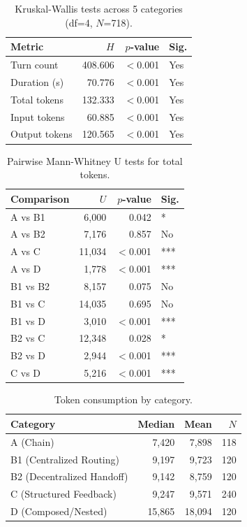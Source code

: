 \documentclass{article}
\begin{document}
\begin{table}[H]
\centering
\caption{Kruskal-Wallis tests across 5 categories (df=4, $N$=718).}
\label{tab:kruskal}
{\small
\begin{tabular}{@{}lrrl@{}}
\toprule
\textbf{Metric} & \textbf{$H$} & \textbf{$p$-value} & \textbf{Sig.} \\
\midrule
Turn count & 408.606 & $<$0.001 & Yes \\
Duration (s) & 70.776 & $<$0.001 & Yes \\
Total tokens & 132.333 & $<$0.001 & Yes \\
Input tokens & 60.885 & $<$0.001 & Yes \\
Output tokens & 120.565 & $<$0.001 & Yes \\
\bottomrule
\end{tabular}
}
\end{table}

\begin{table}[H]
\centering
\caption{Pairwise Mann-Whitney U tests for total tokens.}
\label{tab:pairwise}
{\small
\begin{tabular}{@{}lrrl@{}}
\toprule
\textbf{Comparison} & \textbf{$U$} & \textbf{$p$-value} & \textbf{Sig.} \\
\midrule
A vs B1 & 6,000 & 0.042 & * \\
A vs B2 & 7,176 & 0.857 & No \\
A vs C & 11,034 & $<$0.001 & *** \\
A vs D & 1,778 & $<$0.001 & *** \\
B1 vs B2 & 8,157 & 0.075 & No \\
B1 vs C & 14,035 & 0.695 & No \\
B1 vs D & 3,010 & $<$0.001 & *** \\
B2 vs C & 12,348 & 0.028 & * \\
B2 vs D & 2,944 & $<$0.001 & *** \\
C vs D & 5,216 & $<$0.001 & *** \\
\bottomrule
\end{tabular}
}
\end{table}

\begin{table}[H]
\centering
\caption{Token consumption by category.}
\label{tab:category_tokens}
{\small
\begin{tabular}{@{}lrrr@{}}
\toprule
\textbf{Category} & \textbf{Median} & \textbf{Mean} & $N$ \\
\midrule
A (Chain) & 7,420 & 7,898 & 118 \\
B1 (Centralized Routing) & 9,197 & 9,723 & 120 \\
B2 (Decentralized Handoff) & 9,142 & 8,759 & 120 \\
C (Structured Feedback) & 9,247 & 9,571 & 240 \\
D (Composed/Nested) & 15,865 & 18,094 & 120 \\
\bottomrule
\end{tabular}
}
\end{table}
\end{document}

